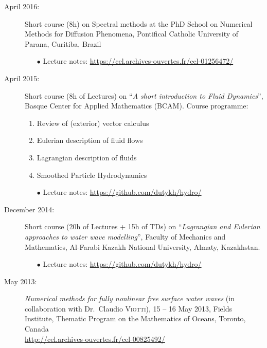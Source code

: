 \begin{description}

  \item[April 2016:] Short course (8h) on Spectral methods at the PhD School on Numerical Methods for Diffusion Phenomena, Pontifical Catholic University of Parana, Curitiba, Brazil
  \begin{itemize}
    \item[$\bullet$] Lecture notes: \url{https://cel.archives-ouvertes.fr/cel-01256472/}
  \end{itemize}

  \item[April 2015:] Short course (8h of Lectures) on ``\textit{A short introduction to Fluid Dynamics}'', Basque Center for Applied Mathematics (BCAM). Course programme:
  \begin{enumerate}
    \item Review of (exterior) vector calculus
    \item Eulerian description of fluid flows
    \item Lagrangian description of fluids
    \item Smoothed Particle Hydrodynamics
  \end{enumerate}
  \begin{itemize}
    \item[$\bullet$] Lecture notes: \url{https://github.com/dutykh/hydro/}
  \end{itemize}

  \item[December 2014:] Short course (20h of Lectures + 15h of TDs) on ``\textit{Lagrangian and Eulerian approaches to water wave modelling}'', Faculty of Mechanics and Mathematics, Al-Farabi Kazakh National University, Almaty, Kazakhstan.
  \begin{itemize}
    \item[$\bullet$] Lecture notes: \url{https://github.com/dutykh/hydro/}
  \end{itemize}

  \item[May 2013:] \textit{Numerical methods for fully nonlinear free surface water waves} (in collaboration with Dr.~Claudio \textsc{Viotti}), 15 -- 16 May 2013, Fields Institute, Thematic Program on the Mathematics of Oceans, Toronto, Canada \\
  \url{http://cel.archives-ouvertes.fr/cel-00825492/}
  
\end{description}

